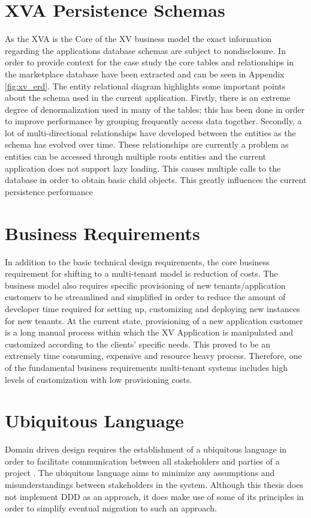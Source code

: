\section{XVA Persistence Schemas}

As the XVA is the Core of the XV business model the exact information regarding the applications database schemas are subject to nondisclosure. In order to provide context for the case study the core tables and relationships in the marketplace database have been extracted and can be seen in Appendix \ref{fig:xv_erd}. The entity relational diagram highlights some important points about the schema used in the current application. Firstly, there is an extreme degree of denormalization used in many of the tables; this has been done in order to improve performance by grouping frequently access data together. Secondly, a lot of multi-directional relationships have developed between the entities as the schema has evolved over time. These relationships are currently a problem as entities can be accessed through multiple roots entities and the current application does not support lazy loading. This causes multiple calls to the database in order to obtain basic child objects. This greatly influences the current persistence performance



\section{Business Requirements}

In addition to the basic technical design requirements, the core business requirement for shifting to a multi-tenant model is reduction of costs. The business model also requires specific provisioning of new tenants/application customers to be streamlined and simplified in order to reduce the amount of developer time required for setting up, customizing and deploying new instances for new tenants. At the current state, provisioning of a new application customer is a long manual process within which the XV Application is manipulated and customized according to the clients' specific needs. This proved to be an extremely time consuming, expensive and resource heavy process. Therefore, one of the fundamental business requirements multi-tenant systems includes high levels of customization with low provisioning costs.

\section{Ubiquitous Language}
Domain driven design requires the establishment of a ubiquitous language in order to facilitate communication between all stakeholders and parties of a project \cite{Evans2003}. The ubiquitous language aims to minimize any assumptions and misunderstandings between stakeholders in the system.  Although this thesis does not implement DDD as an approach, it does make use of some of its principles in order to simplify eventual migration to such an approach.

